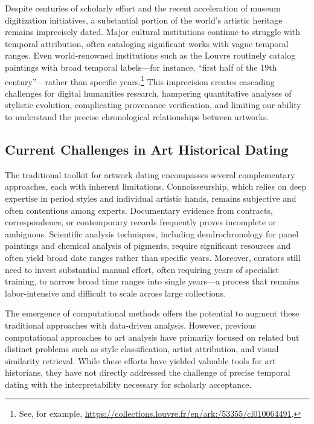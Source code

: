 \documentclass[10pt,twocolumn,letterpaper]{article}
\begin{document}
Despite centuries of scholarly effort and the recent acceleration of museum digitization initiatives, a substantial portion of the world's artistic heritage remains imprecisely dated. Major cultural institutions continue to struggle with temporal attribution, often cataloging significant works with vague temporal ranges. Even world-renowned institutions such as the Louvre routinely catalog paintings with broad temporal labels—for instance, ``first half of the 19th century''—rather than specific years.\footnote{See, for example, \url{https://collections.louvre.fr/en/ark:/53355/cl010064491}.} This imprecision creates cascading challenges for digital humanities research, hampering quantitative analyses of stylistic evolution, complicating provenance verification, and limiting our ability to understand the precise chronological relationships between artworks.

\subsection{Current Challenges in Art Historical Dating}

The traditional toolkit for artwork dating encompasses several complementary approaches, each with inherent limitations. Connoisseurship, which relies on deep expertise in period styles and individual artistic hands, remains subjective and often contentious among experts. Documentary evidence from contracts, correspondence, or contemporary records frequently proves incomplete or ambiguous. Scientific analysis techniques, including dendrochronology for panel paintings and chemical analysis of pigments, require significant resources and often yield broad date ranges rather than specific years. Moreover, curators still need to invest substantial manual effort, often requiring years of specialist training, to narrow broad time ranges into single years—a process that remains labor-intensive and difficult to scale across large collections.

The emergence of computational methods offers the potential to augment these traditional approaches with data-driven analysis. However, previous computational approaches to art analysis have primarily focused on related but distinct problems such as style classification, artist attribution, and visual similarity retrieval. While these efforts have yielded valuable tools for art historians, they have not directly addressed the challenge of precise temporal dating with the interpretability necessary for scholarly acceptance.
\end{document}
